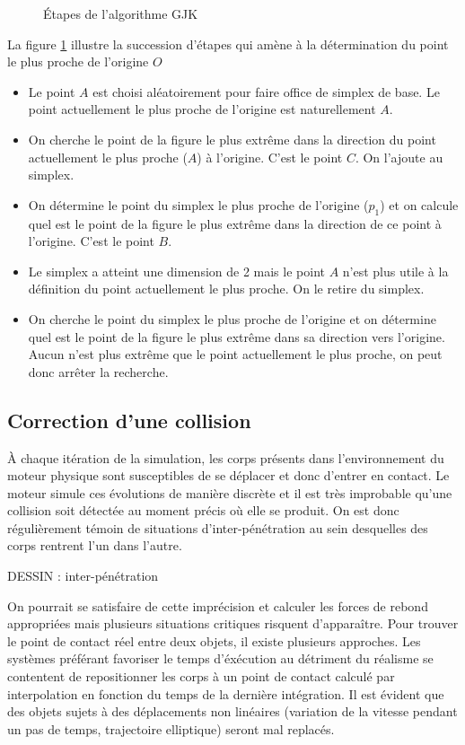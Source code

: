\begin{figure}
  
  \caption{{\'E}tapes de l'algorithme GJK}
  \label{gjk}
\end{figure}

La figure \ref{gjk} illustre la succession d'étapes qui amène à la
détermination du point le plus proche de l'origine $O$

\begin{itemize}
\item Le point $A$ est choisi aléatoirement pour faire office de
  simplex de base. Le point actuellement le plus proche de l'origine
  est naturellement $A$.
\item On cherche le point de la figure le plus extrême dans la
  direction du point actuellement le plus proche ($A$) à
  l'origine. C'est le point $C$. On l'ajoute au simplex.
\item On détermine le point du simplex le plus proche de l'origine
  ($p_1$) et on calcule quel est le point de la figure le plus extrême
  dans la direction de ce point à l'origine. C'est le point $B$.
\item Le simplex a atteint une dimension de 2 mais le point $A$ n'est
  plus utile à la définition du point actuellement le plus proche. On
  le retire du simplex.
\item On cherche le point du simplex le plus proche de l'origine et on
  détermine quel est le point de la figure le plus extrême dans sa
  direction vers l'origine. Aucun n'est plus extrême que le point
  actuellement le plus proche, on peut donc arrêter la recherche.
\end{itemize}

\subsection{Correction d'une collision}

\`A chaque itération de la simulation, les corps présents dans
l'environnement du moteur physique sont susceptibles de se déplacer et
donc d'entrer en contact. Le moteur simule ces évolutions de manière
discrète et il est très improbable qu'une collision soit détectée au
moment précis o\`u elle se produit. On est donc régulièrement témoin
de situations d'inter-pénétration au sein desquelles des corps
rentrent l'un dans l'autre.

DESSIN : inter-pénétration

On pourrait se satisfaire de cette imprécision et calculer les forces
de rebond appropriées mais plusieurs situations critiques risquent
d'apparaître. Pour trouver le point de contact réel entre deux objets,
il existe plusieurs approches. Les systèmes préférant favoriser le
temps d'éxécution au détriment du réalisme se contentent de
repositionner les corps à un point de contact calculé par
interpolation en fonction du temps de la dernière intégration. Il est
évident que des objets sujets à des déplacements non linéaires
(variation de la vitesse pendant un pas de temps, trajectoire
elliptique) seront mal replacés.

